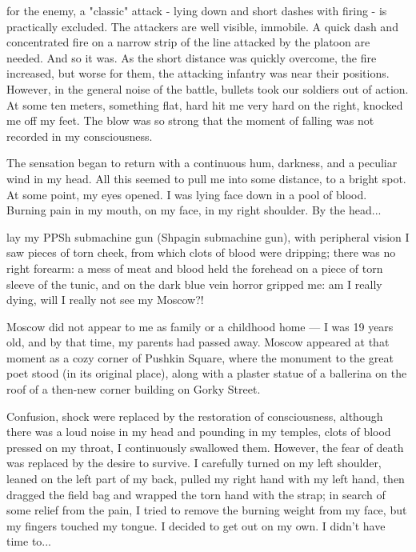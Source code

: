 \label{9-1}
for the enemy, a "classic" attack - lying down and short dashes with firing - is practically excluded. The attackers are well visible, immobile. A quick dash and concentrated fire on a narrow strip of the line attacked by the platoon are needed. And so it was. As the short distance was quickly overcome, the fire increased, but worse for them, the attacking infantry was near their positions. However, in the general noise of the battle, bullets took our soldiers out of action. At some ten meters, something flat, hard hit me very hard on the right, knocked me off my feet. The blow was so strong that the moment of falling was not recorded in my consciousness.

\label{9-2}
The sensation began to return with a continuous hum, darkness, and a peculiar wind in my head. All this seemed to pull me into some distance, to a bright spot. At some point, my eyes opened. I was lying face down in a pool of blood. Burning pain in my mouth, on my face, in my right shoulder. By the head...

\label{10-1}
lay my PPSh submachine gun (Shpagin submachine gun), with peripheral vision I saw pieces of torn cheek, from which clots of blood were dripping; there was no right forearm: a mess of meat and blood held the forehead on a piece of torn sleeve of the tunic, and on the dark blue vein horror gripped me: am I really dying, will I really not see my Moscow?!

\label{10-2}
Moscow did not appear to me as family or a childhood home — I was 19 years old, and by that time, my parents had passed away. Moscow appeared at that moment as a cozy corner of Pushkin Square, where the monument to the great poet stood (in its original place), along with a plaster statue of a ballerina on the roof of a then-new corner building on Gorky Street.

\label{10-3}
Confusion, shock were replaced by the restoration of consciousness, although there was a loud noise in my head and pounding in my temples, clots of blood pressed on my throat, I continuously swallowed them. However, the fear of death was replaced by the desire to survive. I carefully turned on my left shoulder, leaned on the left part of my back, pulled my right hand with my left hand, then dragged the field bag and wrapped the torn hand with the strap; in search of some relief from the pain, I tried to remove the burning weight from my face, but my fingers touched my tongue. I decided to get out on my own. I didn't have time to...

